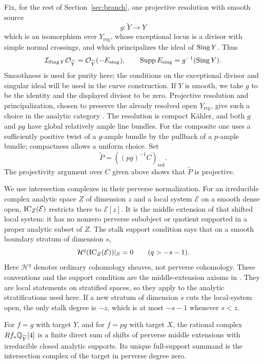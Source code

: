 Fix, for the rest of Section~\ref{sec:branch}, one projective
resolution with smooth source
\[
 g\colon\widetilde Y\longrightarrow Y
\]
which is an isomorphism over $Y_{\mathrm{reg}}$, whose exceptional
locus is a divisor with simple normal crossings, and which principalizes
the ideal of $\operatorname{Sing} Y$.  Thus
\[
 \mathcal I_{\operatorname{Sing} Y}\mathcal O_{\widetilde Y}
       =\mathcal O_{\widetilde Y}(-E_{\mathrm{sing}}),
 \qquad
 \operatorname{Supp} E_{\mathrm{sing}}=g^{-1}(\operatorname{Sing} Y).
\]
Smoothness is used for purity here; the conditions on the exceptional
divisor and singular ideal will be used in the curve construction.
If $Y$ is smooth, we take $g$ to be the identity and the displayed
divisor to be zero.  Projective resolution and principalization, chosen
to preserve the already resolved open $Y_{\mathrm{reg}}$, give such a
choice in the analytic category
\cite[Theorems~1.10, 12.2, and 13.2(1)]{BierstoneMilman1997}.  The resolution is compact
K\"ahler, and both $g$ and $pg$ have global relatively ample line
bundles.  For the composite one uses a sufficiently positive twist
of a $g$-ample bundle by the pullback of a $p$-ample bundle; compactness
allows a uniform choice.  Set
\[
 \widetilde P=((pg)^{-1}C)_{\mathrm{red}}.
\]
The projectivity argument over $C$ given above shows that
$\widetilde P$ is projective.

We use intersection complexes in their perverse normalization.  For
an irreducible complex analytic space $Z$ of dimension $z$ and a local
system $\mathcal E$ on a smooth dense open, $\operatorname{IC}_Z(\mathcal E)$
restricts there to $\mathcal E[z]$.  It is the middle extension of
that shifted local system: it has no nonzero perverse subobject or
quotient supported in a proper analytic subset of $Z$.  The stalk
support condition says that on a smooth boundary stratum of dimension
$s$,
\begin{equation}\label{eq:branch-ic-stalk-bound}
 \mathcal H^q(\operatorname{IC}_Z(\mathcal E))|_S=0\qquad(q>-s-1).
\end{equation}
Here $\mathcal H^q$ denotes ordinary cohomology sheaves, not perverse
cohomology.  These conventions and the support condition are the
middle-extension axioms in
\cite[Section~2.3 and Section~3.3, Axiom {\rm[AX1]}(c)]{GoreskyMacPhersonIHII}.
They are local statements on stratified spaces, so they apply to the
analytic stratifications used here.  If a new stratum of dimension $s$
cuts the local-system open, the only stalk degree is $-z$, which is
at most $-s-1$ whenever $s<z$.

\begin{lemma}
\label{lem:branch-analytic-decomposition}
For $f=g$ with target $Y$, and for $f=pg$ with target $X$, the rational
complex $Rf_*\mathbb{Q}_{\widetilde Y}[4]$ is a finite direct sum of shifts of
perverse middle extensions with irreducible closed analytic supports.
Its unique full-support summand is the intersection complex of the
target in perverse degree zero.
\end{lemma}


